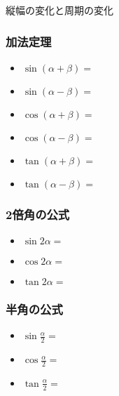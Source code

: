 \documentclass[10pt,dvipdfmx]{jsarticle}
\begin{document}
\begin{itembox}[l]{縦幅の変化と周期の変化}
  \vspace{10mm}
\end{itembox}

\subsubsection*{加法定理}
\begin{multicols}{2}
  \begin{large}
    \begin{itemize}
      \item $\sin(\alpha+\beta)=$
      \item $\sin(\alpha-\beta)=$
      \item $\cos(\alpha+\beta)=$
      \item $\cos(\alpha-\beta)=$
      \item $\tan(\alpha+\beta)=$
      \item $\tan(\alpha-\beta)=$
    \end{itemize}
  \end{large}
\end{multicols}

\begin{multicols}{2}


  \subsubsection*{2倍角の公式}
  \begin{large}
    \begin{itemize}
      \item $\sin2\alpha=$
      \item $\cos2\alpha=$
      \item $\tan2\alpha=$
    \end{itemize}
  \end{large}

  \subsubsection*{半角の公式}
  \begin{large}
    \begin{itemize}
      \item $\sin\frac{\alpha}{2}=$
      \item $\cos\frac{\alpha}{2}=$
      \item $\tan\frac{\alpha}{2}=$
    \end{itemize}
  \end{large}
\end{multicols}
\end{document}
